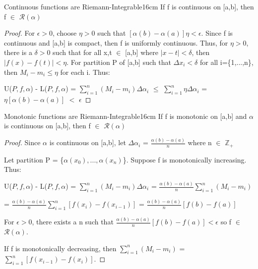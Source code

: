     \begin{wtheorem}{Continuous functions are Riemann-Integrable}{16cm}
        If f is continuous on [a,b], then f $\in$ $\mathscr{R}(\alpha)$
    \end{wtheorem}

    \begin{proof}
        For $\epsilon > 0$, choose $\eta > 0$ such that
        $[\alpha(b)-\alpha(a)] \eta < \epsilon$.
        Since f is continuous and [a,b] is compact, then f is uniformly continuous.
        Thus, for $\eta > 0$, there is a $\delta > 0$ such that
        for all x,t $\in$ [a,b] where $|x-t| < \delta$,
        then $|f(x) - f(t)| < \eta$.
        For partition P of [a,b] such that $\Delta x_i < \delta$ for all
        i=\{1,...,n\}, then $M_i - m_i \leq \eta$ for each i. Thus:
        
        \hspace{0.5cm}
        U($P,f,\alpha$) - L($P,f,\alpha$)
        = $\sum_{i=1}^n (M_i - m_i) \Delta \alpha_i$
        $\leq$ $\sum_{i=1}^n \eta \Delta \alpha_i$
        = $\eta [\alpha(b) - \alpha(a)]$
        $<$ $\epsilon$
    \end{proof}

    \vspace{0.5cm}



    \begin{wtheorem}{Monotonic functions are Riemann-Integrable}{16cm}
        If f is monotonic on [a,b] and $\alpha$ is continuous on [a,b], then
        f $\in$ $\mathscr{R}(\alpha)$        
    \end{wtheorem}
    
    \begin{proof}
        Since $\alpha$ is continuous on [a,b],
        let $\Delta \alpha_i$ = $\frac{\alpha(b) - \alpha(a)}{n}$
        where n $\in$ $\mathbb{Z}_+$

        Let partition P = \{$\alpha(x_0),...,\alpha(x_n)$\}.
        Suppose f is monotonically increasing. Thus:
        
        \hspace{0.5cm}
        U($P,f,\alpha$) - L($P,f,\alpha$)
        = $\sum_{i=1}^n (M_i - m_i) \Delta \alpha_i$
        = $\frac{\alpha(b) - \alpha(a)}{n} \sum_{i=1}^n (M_i - m_i)$

        \hspace{4.5cm}
        = $\frac{\alpha(b) - \alpha(a)}{n} \sum_{i=1}^n [f(x_i) - f(x_{i-1})]$
        = $\frac{\alpha(b) - \alpha(a)}{n} [f(b)-f(a)]$
        
        For $\epsilon > 0$, there exists a n such that
        $\frac{\alpha(b) - \alpha(a)}{n} [f(b)-f(a)] < \epsilon$
        so f $\in$ $\mathscr{R}(\alpha)$.
        
        If f is monotonically decreasing, then
        $\sum_{i=1}^n (M_i - m_i)$ = $\sum_{i=1}^n [f(x_{i-1}) - f(x_i)]$.
    \end{proof}

